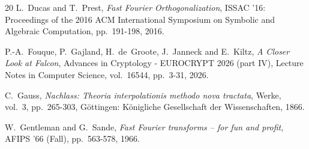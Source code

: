 \documentclass{llncs}
\begin{document}
\begin{thebibliography}{20}
L.~Ducas and T.~Prest,
\emph{Fast Fourier Orthogonalization},
ISSAC '16: Proceedings of the 2016 ACM International Symposium on Symbolic
and Algebraic Computation, pp.~191-198, 2016.




P.-A.~Fouque, P.~Gajland, H.~de~Groote, J.~Janneck and E.~Kiltz,
\emph{A Closer Look at Falcon},
Advances in Cryptology - EUROCRYPT 2026 (part IV), Lecture Notes in
Computer Science, vol.~16544, pp.~3-31, 2026.




C.~Gauss,
\emph{Nachlass: Theoria interpolationis methodo nova tractata},
Werke, vol.~3, pp.~265-303, Göttingen: Königliche Gesellschaft der Wissenschaften, 1866.

W.~Gentleman and G.~Sande,
\emph{Fast Fourier transforms -- for fun and profit},
AFIPS '66 (Fall), pp.~563-578, 1966.



\end{thebibliography}
\end{document}
